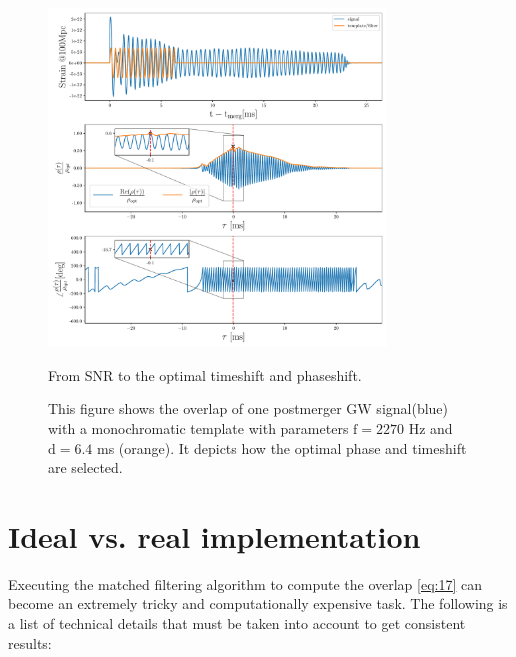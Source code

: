 \begin{figure}[hbt!]
\begin{center}
\includegraphics[width=0.8\textwidth, angle=0]{images/Data_analysis/results/ex_search.pdf}
\captionsetup{width=0.8\textwidth}
\caption{From SNR to the optimal timeshift and phaseshift.}
\caption*{This figure shows the overlap of one postmerger GW signal(blue) with a monochromatic template with parameters $\mathrm{f=2270}$ Hz and $\mathrm{d=6.4}$ ms (orange). It depicts how the optimal phase and timeshift are selected.
}
\label{fig:7}
\end{center}
\end{figure}

\FloatBarrier



\section{Ideal vs. real implementation}

Executing the matched filtering algorithm to compute the overlap \ref{eq:17} can become an extremely tricky and computationally expensive task. The following is a list of technical details that must be taken into account to get consistent results:

